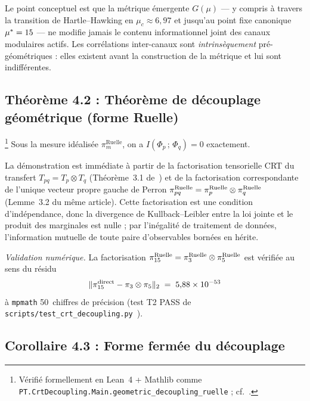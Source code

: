 Le point conceptuel est que la métrique émergente $G(\mu)$ --- y
compris à travers la transition de Hartle--Hawking en $\mu_c
\approx 6{,}97$ et jusqu'au point fixe canonique
${\mu^{*}} = 15$ --- ne modifie jamais le contenu informationnel
joint des canaux modulaires actifs. Les corrélations
inter-canaux sont \emph{intrinsèquement} pré-géométriques : elles
existent avant la construction de la métrique et lui sont
indifférentes.

\subsection{Théorème 4.2 : Théorème de découplage géométrique (forme Ruelle)}
\label{ssec:thm_4_2_fr}

\begin{theoreme}
\label{thm:ruelle_zero_fr}
\footnote{Vérifié formellement en Lean~4 + Mathlib comme
\texttt{PT.CrtDecoupling.Main.geometric\_decoupling\_ruelle} ;
cf.~\cite[\S~8.5]{PT_CRT_DECOUPLING}.}
Sous la mesure idéalisée $\pi_m^{\mathrm{Ruelle}}$, on a
$I(\Phi_p\,;\,\Phi_q) = 0$ exactement.
\end{theoreme}

La démonstration est immédiate à partir de la factorisation
tensorielle CRT du transfert
$T_{pq} = T_p \otimes T_q$ (Théorème~3.1
de~\cite{PT_CRT_DECOUPLING}) et de la factorisation correspondante
de l'unique vecteur propre gauche de Perron
$\pi_{pq}^{\rm Ruelle} = \pi_p^{\rm Ruelle} \otimes \pi_q^{\rm Ruelle}$
(Lemme~3.2 du même article). Cette factorisation est une
condition d'indépendance, donc la divergence de Kullback--Leibler
entre la loi jointe et le produit des marginales est nulle ;
par l'inégalité de traitement de données, l'information mutuelle
de toute paire d'observables bornées en hérite.

\emph{Validation numérique.} La factorisation
$\pi_{15}^{\rm Ruelle} = \pi_3^{\rm Ruelle} \otimes \pi_5^{\rm Ruelle}$
est vérifiée au sens du résidu
\begin{equation}
  \|\pi_{15}^{\rm direct} - \pi_3 \otimes \pi_5\|_2
  \;=\; 5{,}88 \times 10^{-53}
\end{equation}
à \texttt{mpmath} 50~chiffres de précision (test T2 PASS de
\texttt{scripts/test\_crt\_decoupling.py}~\cite{PT_CRT_DECOUPLING}).

\subsection{Corollaire 4.3 : Forme fermée du découplage}
\label{ssec:cor_4_3_fr}

